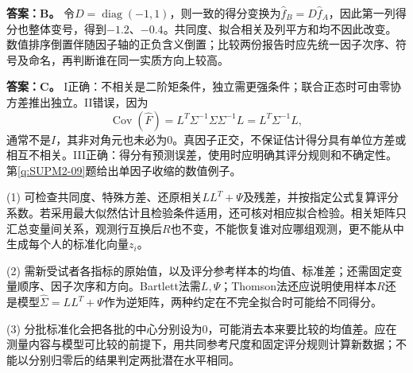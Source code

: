 \textbf{答案：B。} 令$D=\operatorname{diag}(-1,1)$，则一致的得分变换为$\widehat f_B=D\widehat f_A$，因此第一列得分也整体变号，得到$-1.2$、$-0.4$。共同度、拟合相关及列平方和均不因此改变。数值排序倒置伴随因子轴的正负含义倒置；比较两份报告时应先统一因子次序、符号及命名，再判断谁在同一实质方向上较高。
\par\nobreak\smallskip{}

\textbf{答案：C。} I正确：不相关是二阶矩条件，独立需更强条件；联合正态时可由零协方差推出独立。II错误，因为\[\operatorname{Cov}(\widehat F)=L^T\Sigma^{-1}\Sigma\Sigma^{-1}L=L^T\Sigma^{-1}L,\]通常不是$I$，其非对角元也未必为0。真因子正交，不保证估计得分具有单位方差或相互不相关。III正确：得分有预测误差，使用时应明确其评分规则和不确定性。第\ref{q:SUPM2-09}题给出单因子收缩的数值例子。
\par\nobreak\smallskip{}

(1) 可检查共同度、特殊方差、还原相关$LL^T+\Psi$及残差，并按指定公式复算评分系数。若采用最大似然估计且检验条件适用，还可核对相应拟合检验。相关矩阵只汇总变量间关系，观测行互换后$R$也不变，不能恢复谁对应哪组观测，更不能从中生成每个人的标准化向量$z_i$。\par (2) 需新受试者各指标的原始值，以及评分参考样本的均值、标准差；还需固定变量顺序、因子次序和方向。Bartlett法需$L,\Psi$；Thomson法还应说明使用样本$R$还是模型$\widehat\Sigma=LL^T+\Psi$作为逆矩阵，两种约定在不完全拟合时可能给不同得分。\par (3) 分批标准化会把各批的中心分别设为0，可能消去本来要比较的均值差。应在测量内容与模型可比较的前提下，用共同参考尺度和固定评分规则计算新数据；不能以分别归零后的结果判定两批潜在水平相同。
\par\nobreak\smallskip{}


